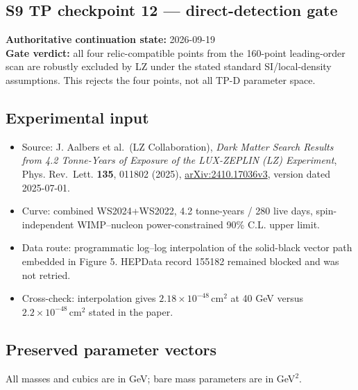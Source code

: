 \documentclass[
]{article}
\providecommand{\tightlist}{%
  \setlength{\itemsep}{0pt}\setlength{\parskip}{0pt}}
\begin{document}
\hypertarget{s9-tp-checkpoint-12-direct-detection-gate}{%
\subsection{S9 TP checkpoint 12 --- direct-detection
gate}\label{s9-tp-checkpoint-12-direct-detection-gate}}

\textbf{Authoritative continuation state:} 2026-09-19\\
\textbf{Gate verdict:} all four relic-compatible points from the
160-point leading-order scan are robustly excluded by LZ under the
stated standard SI/local-density assumptions. This rejects the four
points, not all TP-D parameter space.

\hypertarget{experimental-input}{%
\subsection{Experimental input}\label{experimental-input}}

\begin{itemize}
\tightlist
\item
  Source: J. Aalbers et al.~(LZ Collaboration), \emph{Dark Matter Search
  Results from 4.2 Tonne-Years of Exposure of the LUX-ZEPLIN (LZ)
  Experiment}, Phys. Rev.~Lett. \textbf{135}, 011802 (2025),
  \href{https://arxiv.org/abs/2410.17036}{arXiv:2410.17036v3}, version
  dated 2025-07-01.
\item
  Curve: combined WS2024+WS2022, 4.2 tonne-years / 280 live days,
  spin-independent WIMP--nucleon power-constrained 90\% C.L. upper
  limit.
\item
  Data route: programmatic log--log interpolation of the solid-black
  vector path embedded in Figure 5. HEPData record 155182 remained
  blocked and was not retried.
\item
  Cross-check: interpolation gives \(2.18\times10^{-48}\,\mathrm{cm^2}\)
  at 40 GeV versus \(2.2\times10^{-48}\,\mathrm{cm^2}\) stated in the
  paper.
\end{itemize}

\hypertarget{preserved-parameter-vectors}{%
\subsection{Preserved parameter
vectors}\label{preserved-parameter-vectors}}

All masses and cubics are in GeV; bare mass parameters are in GeV\(^2\).
\end{document}
